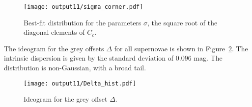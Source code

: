\documentclass[11pt, oneside]{article}   	%
\begin{document}
 
 \begin{figure}[htbp] %
   \centering
   \texttt{[image: output11/sigma\_corner.pdf]} 
   \caption{Best-fit distribution for the parameters $\sigma$, the square root of the diagonal elements of $C_c$.
   \label{sigma:fig}}
\end{figure}

The ideogram for the grey offsets $\Delta$ for all supernovae is shown in Figure~\ref{hist:fig}.  The intrinsic dispersion
is given by the standard deviation of $0.096$ mag.  The distribution is non-Gaussian, with a broad tail. 
\begin{figure}[htbp] %
   \centering
   \texttt{[image: output11/Delta\_hist.pdf]} 
   \caption{Ideogram for the grey offset $\Delta$.
   \label{hist:fig}}
\end{figure}
\end{document}
